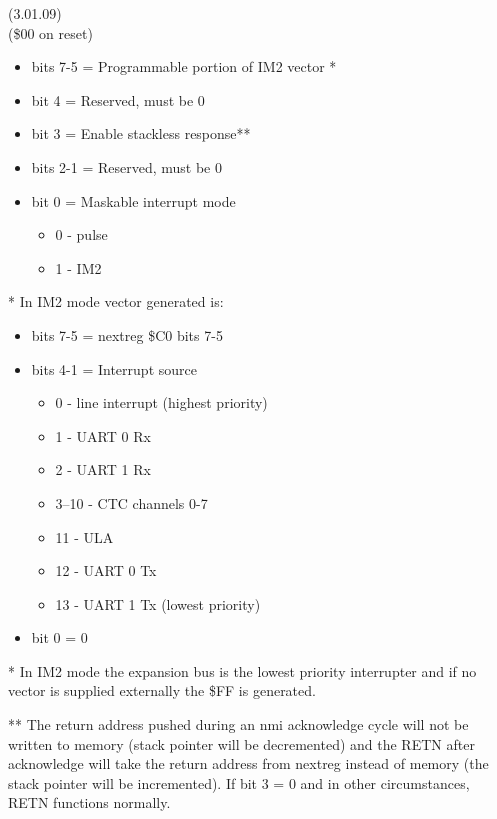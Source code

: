  (3.01.09)\\
(\$00 on reset)
\begin{itemize}
\item bits 7-5 = Programmable portion of IM2 vector *
\item bit 4 = Reserved, must be 0
\item bit 3 = Enable stackless  response**
\item bits 2-1 = Reserved, must be 0
\item bit 0 = Maskable interrupt mode
\begin{itemize}
\item[] 0 - pulse
\item[] 1 - IM2
\end{itemize}
\end{itemize}
* In IM2 mode vector generated is:
\begin{itemize}
\item bits 7-5 = nextreg \$C0 bits 7-5
\item bits 4-1 = Interrupt source
\begin{itemize}
\item[] 0 - line interrupt (highest priority)
\item[] 1 - UART 0 Rx
\item[] 2 - UART 1 Rx
\item[] 3--10 - CTC channels 0-7
\item[] 11 - ULA
\item[] 12 - UART 0 Tx
\item[] 13 - UART 1 Tx (lowest priority)
\end{itemize}
\item bit 0 = 0
\end{itemize}

* In IM2 mode the expansion bus is the lowest priority interrupter and
  if no vector is supplied externally the \$FF is generated.

** The return address pushed during an nmi acknowledge cycle will not
   be written to memory (stack pointer will be decremented) and the
   RETN after acknowledge will take the return address from nextreg
   instead of memory (the stack pointer will be incremented). If bit 3
   = 0 and in other circumstances, RETN functions normally.


